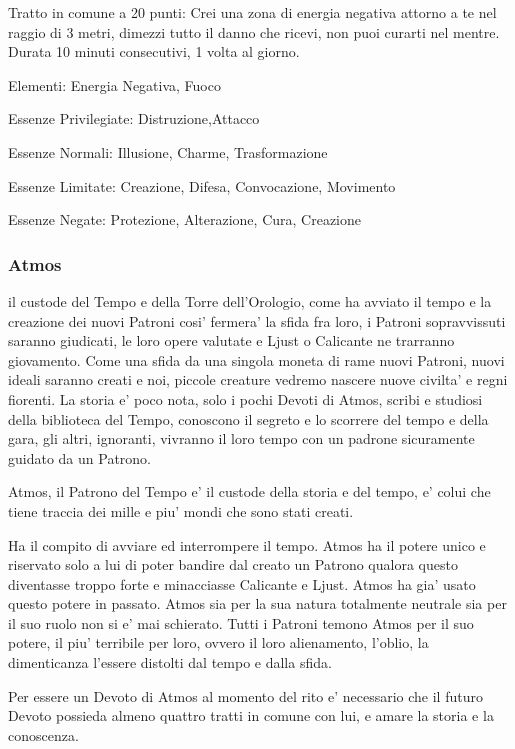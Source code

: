 \documentclass[a4paper,11pt,twoside,openany]{book}
\begin{document}
{Tratto in comune a 20 punti: Crei una zona di energia negativa attorno a te nel raggio di 3 metri, dimezzi tutto il danno che ricevi, non puoi curarti nel mentre. Durata 10 minuti consecutivi, 1 volta al giorno.

\bigskip

Elementi: Energia Negativa, Fuoco

\bigskip

Essenze Privilegiate: Distruzione,Attacco

Essenze Normali: Illusione, Charme, Trasformazione

Essenze Limitate: Creazione, Difesa, Convocazione, Movimento

Essenze Negate: Protezione, Alterazione, Cura, Creazione

\subsubsection{Atmos}

\label{atmos}

il custode del Tempo e della Torre dell'Orologio, come ha avviato il tempo e la creazione dei nuovi Patroni cosi' fermera' la sfida fra loro, i Patroni sopravvissuti saranno giudicati, le loro opere valutate e Ljust o Calicante ne trarranno giovamento. Come una sfida da una singola moneta di rame nuovi Patroni, nuovi ideali saranno creati e noi, piccole creature vedremo nascere nuove civilta' e regni fiorenti. La storia e' poco nota, solo i pochi Devoti di Atmos, scribi e studiosi della biblioteca del Tempo, conoscono il segreto e lo scorrere del tempo e della gara, gli altri, ignoranti, vivranno il loro tempo con un padrone sicuramente guidato da un Patrono.

Atmos, il Patrono del Tempo e' il custode della storia e del tempo, e' colui che tiene traccia dei mille e piu' mondi che sono stati creati.

Ha il compito di avviare ed interrompere il tempo. Atmos ha il potere unico e riservato solo a lui di poter bandire dal creato un Patrono qualora questo diventasse troppo forte e minacciasse Calicante e Ljust. Atmos ha gia' usato questo potere in passato. Atmos sia per la sua natura totalmente neutrale sia per il suo ruolo non si e' mai schierato. Tutti i Patroni temono Atmos per il suo potere, il piu' terribile per loro, ovvero il loro alienamento, l'oblio, la dimenticanza l'essere distolti dal tempo e dalla sfida.

Per essere un Devoto di Atmos al momento del rito e' necessario che il futuro Devoto possieda almeno quattro tratti in comune con lui, e amare la storia e la conoscenza.

}
\end{document}
